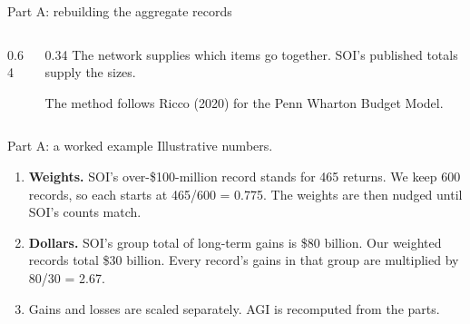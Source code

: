 \begin{frame}{Part A: rebuilding the aggregate records}
  \begin{columns}[c]
    \begin{column}{0.64\textwidth}
      \centering
    \end{column}
    \begin{column}{0.34\textwidth}
      \footnotesize
      The network supplies which items go together. SOI's published totals supply the sizes.

      \vspace{0.6em}
      The method follows Ricco (2020) for the Penn Wharton Budget Model.
    \end{column}
  \end{columns}
\end{frame}

\begin{frame}{Part A: a worked example}
  \small
  Illustrative numbers.
  \vspace{0.4em}
  \begin{enumerate}
    \item \textbf{Weights.} SOI's over-\$100-million record stands for 465 returns. We keep 600
          records, so each starts at 465/600 = 0.775. The weights are then nudged until SOI's counts match.
    \item \textbf{Dollars.} SOI's group total of long-term gains is \$80 billion. Our weighted records
          total \$30 billion. Every record's gains in that group are multiplied by 80/30 = 2.67.
    \item Gains and losses are scaled separately. AGI is recomputed from the parts.
  \end{enumerate}
\end{frame}

